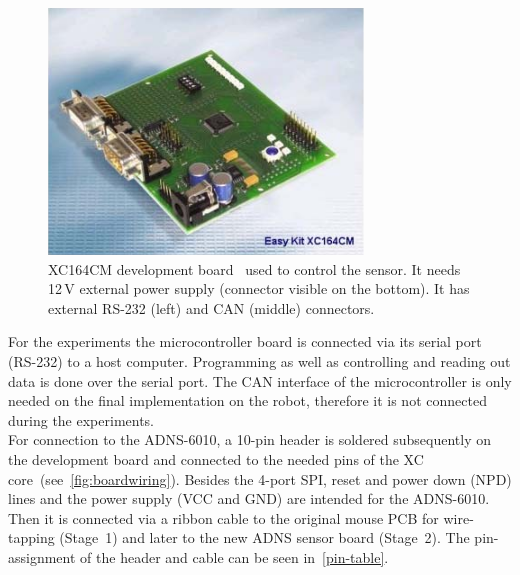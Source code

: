\documentclass[12pt,a4paper]{article}
\begin{document}
\begin{figure}[htbp]
\begin{center}
\includegraphics[width=0.5\columnwidth]{figures/xcdevboard.png}
\caption{\label{fig:xcdevboard}
XC164CM development board~\cite{xc} used to control the sensor.
It needs 12\,V external power supply (connector visible on the bottom).
It has external RS-232 (left) and CAN (middle) connectors.
}
\end{center}
\end{figure}

For the experiments the microcontroller board is connected via its serial port (RS-232) to a host computer.
Programming as well as controlling and reading out data is done over the serial port.
The CAN interface of the microcontroller is only needed on the final implementation on the robot, therefore it is not connected during the experiments.\\
For connection to the ADNS-6010, a 10-pin header is soldered subsequently on the development board and connected to the needed pins of the XC core~(see~\autoref{fig:boardwiring}).
Besides the 4-port SPI, reset and power down (NPD) lines and the power supply (VCC and GND) are intended for the ADNS-6010.
Then it is connected via a ribbon cable to the original mouse PCB for wire-tapping (Stage~1) and later to the new ADNS sensor board (Stage~2).
The pin-assignment of the header and cable can be seen in~\autoref{pin-table}. 
\end{document}
